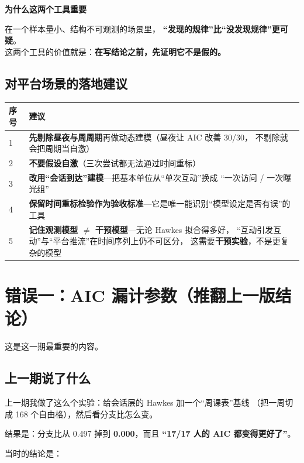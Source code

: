 \documentclass[UTF8,a4paper,11pt]{ctexart}
\newenvironment{explainbox}[1]
{\begin{center}\begin{minipage}{0.94\textwidth}\colorbox{boxbg}{\parbox{0.92\textwidth}{\textbf{#1}\par\vspace{2pt}}}}
{\end{minipage}\end{center}}
\newcommand{\hl}[1]{\textcolor{blue!70!black}{\textbf{#1}}}
\begin{document}
\begin{explainbox}{为什么这两个工具重要}
在一个样本量小、结构不可观测的场景里，
\hl{“发现的规律”比“没发现规律”更可疑}。\\
这两个工具的价值就是：\textbf{在写结论之前，先证明它不是假的。}
\end{explainbox}

\subsection{对平台场景的落地建议}

\begin{longtable}{@{}p{0.8cm}p{12.8cm}@{}}
\toprule
\textbf{序号} & \textbf{建议} \\
\midrule
1 & \textbf{先剔除昼夜与周周期}再做动态建模（昼夜让 AIC 改善 30/30，
不剔除就会把周期当自激） \\
2 & \textbf{不要假设自激}（三次尝试都无法通过时间重标） \\
3 & \textbf{改用“会话到达”建模}---把基本单位从“单次互动”换成
“一次访问 / 一次曝光组” \\
4 & \textbf{保留时间重标检验作为验收标准}---它是唯一能识别“模型设定是否有误”的工具 \\
5 & \textbf{记住观测模型 $\neq$ 干预模型}---无论 Hawkes 拟合得多好，
“互动引发互动”与“平台推流”在时间序列上仍不可区分，
这需要\textbf{干预实验}，不是更复杂的模型 \\
\bottomrule
\end{longtable}

\newpage

\section{错误一：AIC 漏计参数（推翻上一版结论）}

这是这一期最重要的内容。

\subsection{上一期说了什么}

上一期我做了这么个实验：给会话层的 Hawkes 加一个“周课表”基线
（把一周切成 168 个自由格），然后看分支比怎么变。

结果是：分支比从 0.497 掉到 \textbf{0.000}，而且
\textbf{“17/17 人的 AIC 都变得更好了”}。

当时的结论是：
\end{document}
